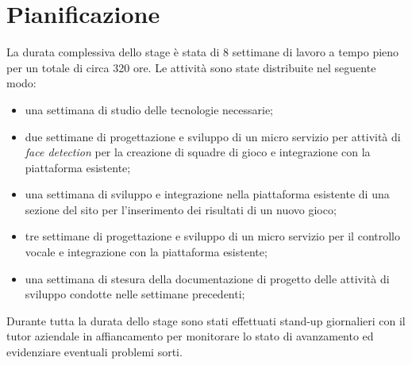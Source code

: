 \section{Pianificazione}
La durata complessiva dello stage è stata di 8 settimane di lavoro a tempo pieno per un totale di circa 320 ore.
Le attività sono state distribuite nel seguente modo:
\begin{itemize}
	\item una settimana di studio delle tecnologie necessarie;
	\item due settimane di progettazione e sviluppo di un micro servizio per attività di \emph{face detection} per 
	la creazione di squadre di gioco e integrazione con la piattaforma esistente;
	\item una settimana di sviluppo e integrazione nella piattaforma esistente di una sezione del sito per l'inserimento dei risultati di un nuovo gioco;
	\item tre settimane di progettazione e sviluppo di un micro servizio per il controllo vocale e integrazione con la piattaforma esistente;
	\item una settimana di stesura della documentazione di progetto delle attività di sviluppo condotte nelle settimane
	precedenti;
\end{itemize}
Durante tutta la durata dello stage sono stati effettuati stand-up giornalieri con il tutor aziendale in affiancamento per 
monitorare lo stato di avanzamento ed evidenziare eventuali problemi sorti.
